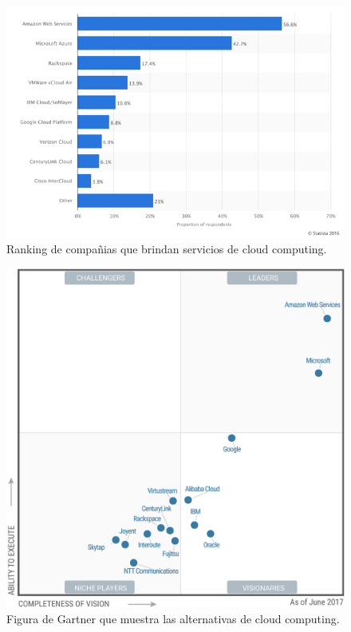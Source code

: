 \begin{figure}[H]
\centering
\includegraphics[width=125mm,scale=1]{Capitulos/PropuestadeSolucion/Imagenes/rank_cloud}
\caption{Ranking de compañias que brindan servicios de cloud computing\citep{statista_ranking}.}
  \label{graph_cloud}
\end{figure}

\begin{figure}[H]
\centering
\includegraphics[scale=0.5]{Capitulos/PropuestadeSolucion/Imagenes/gartner_cloud}
\caption{Figura de Gartner que muestra las alternativas de cloud computing\citep{gartner_webpage}.}
  \label{gartner_cloud}
\end{figure}

